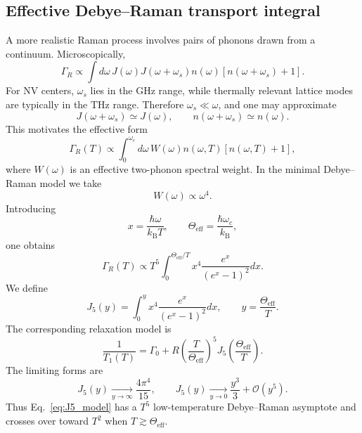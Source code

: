 \documentclass[12pt,a4paper]{article}
\begin{document}
\subsection{Effective Debye--Raman transport integral}
A more realistic Raman process involves pairs of phonons drawn from a continuum. Microscopically,
\begin{equation}
\Gamma_R \propto \int d\omega\, J(\omega)J(\omega+\omega_s) n(\omega)[n(\omega+\omega_s)+1].
\label{eq:microscopic_raman}
\end{equation}
For NV centers, $\omega_s$ lies in the GHz range, while thermally relevant lattice modes are typically in the THz range. Therefore $\omega_s\ll\omega$, and one may approximate
\begin{equation}
J(\omega+\omega_s)\simeq J(\omega), \qquad n(\omega+\omega_s)\simeq n(\omega).
\end{equation}
This motivates the effective form
\begin{equation}
\Gamma_R(T) \propto \int_0^{\omega_c}d\omega\, W(\omega) n(\omega,T)[n(\omega,T)+1],
\label{eq:effective_raman_integral}
\end{equation}
where $W(\omega)$ is an effective two-phonon spectral weight. In the minimal Debye--Raman model we take
\begin{equation}
W(\omega)\propto\omega^4.
\label{eq:omega4_weight}
\end{equation}
Introducing
\begin{equation}
x=\frac{\hbar\omega}{k_{\mathrm B}T}, \qquad \Theta_{\mathrm{eff}}=\frac{\hbar\omega_c}{k_{\mathrm B}},
\end{equation}
one obtains
\begin{equation}
\Gamma_R(T) \propto T^5 \int_0^{\Theta_{\mathrm{eff}}/T} x^4 \frac{e^x}{(e^x-1)^2} dx.
\end{equation}
We define
\begin{equation}
\boxed{ J_5(y) = \int_0^y x^4 \frac{e^x}{(e^x-1)^2} dx }, \qquad y=\frac{\Theta_{\mathrm{eff}}}{T}.
\label{eq:J5_definition}
\end{equation}
The corresponding relaxation model is
\begin{equation}
\boxed{
\frac{1}{T_1(T)} = \Gamma_0 + R \left( \frac{T}{\Theta_{\mathrm{eff}}} \right)^5 J_5\!\left( \frac{\Theta_{\mathrm{eff}}}{T} \right)
} .
\label{eq:J5_model}
\end{equation}
The limiting forms are
\begin{equation}
J_5(y)\xrightarrow[y\to\infty]{} \frac{4\pi^4}{15}, \qquad J_5(y)\xrightarrow[y\to0]{} \frac{y^3}{3} + \mathcal O(y^5).
\label{eq:J5_limits}
\end{equation}
Thus Eq.~\eqref{eq:J5_model} has a $T^5$ low-temperature Debye--Raman asymptote and crosses over toward $T^2$ when $T\gtrsim\Theta_{\mathrm{eff}}$.
\end{document}
